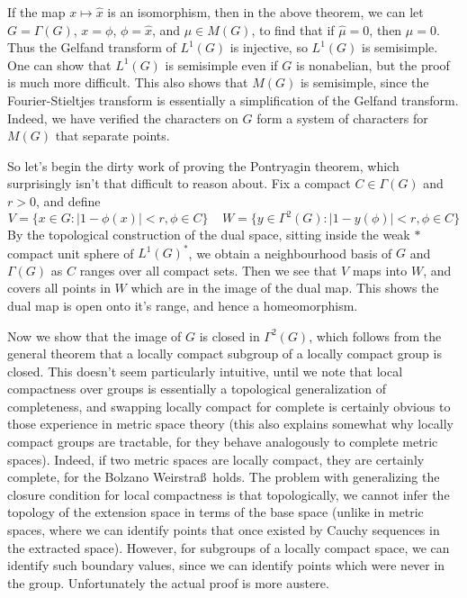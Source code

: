 \documentclass{article}
\theoremstyle{plain}
\theoremstyle{definition}
\begin{document}
If the map $x \mapsto \widehat{x}$ is an isomorphism, then in the above theorem, we can let $G = \Gamma(G)$, $x = \phi$, $\phi = \widehat{x}$, and $\mu \in M(G)$, to find that if $\widehat{\mu} = 0$, then $\mu = 0$. Thus the Gelfand transform of $L^1(G)$ is injective, so $L^1(G)$ is semisimple. One can show that $L^1(G)$ is semisimple even if $G$ is nonabelian, but the proof is much more difficult. This also shows that $M(G)$ is semisimple, since the Fourier-Stieltjes transform is essentially a simplification of the Gelfand transform. Indeed, we have verified the characters on $G$ form a system of characters for $M(G)$ that separate points.

So let's begin the dirty work of proving the Pontryagin theorem, which surprisingly isn't that difficult to reason about. Fix a compact $C \in \Gamma(G)$ and $r > 0$, and define
%
\[ V = \{ x \in G: |1 - \phi(x)| < r, \phi \in C \}\ \ \ \ \ W = \{ y \in \Gamma^2(G) : |1 - y(\phi)| < r, \phi \in C \} \]
%
By the topological construction of the dual space, sitting inside the weak $*$ compact unit sphere of $L^1(G)^*$, we obtain a neighbourhood basis of $G$ and $\Gamma(G)$ as $C$ ranges over all compact sets. Then we see that $V$ maps into $W$, and covers all points in $W$ which are in the image of the dual map. This shows the dual map is open onto it's range, and hence a homeomorphism.

Now we show that the image of $G$ is closed in $\Gamma^2(G)$, which follows from the general theorem that a locally compact subgroup of a locally compact group is closed. This doesn't seem particularly intuitive, until we note that local compactness over groups is essentially a topological generalization of completeness, and swapping locally compact for complete is certainly obvious to those experience in metric space theory (this also explains somewhat why locally compact groups are tractable, for they behave analogously to complete metric spaces). Indeed, if two metric spaces are locally compact, they are certainly complete, for the Bolzano Weirstra\ss\ holds. The problem with generalizing the closure condition for local compactness is that topologically, we cannot infer the topology of the extension space in terms of the base space (unlike in metric spaces, where we can identify points that once existed by Cauchy sequences in the extracted space). However, for subgroups of a locally compact space, we can identify such boundary values, since we can identify points which were never in the group. Unfortunately the actual proof is more austere.
\end{document}
